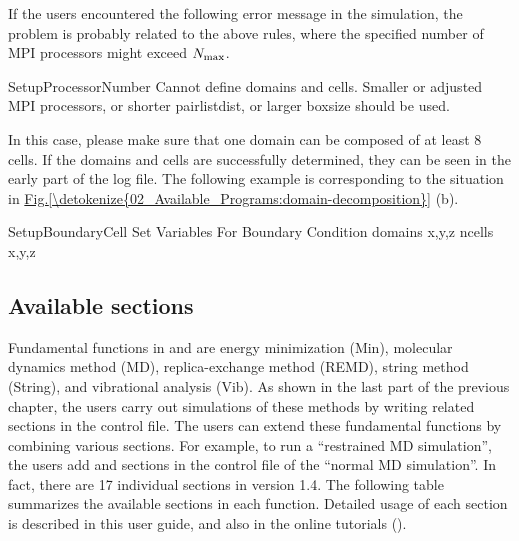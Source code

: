 \documentclass[a4paper,11pt,oneside,english]{sphinxmanual}
\begin{document}
If the users encountered the following error message in the simulation,
the problem is probably related to the above rules, where the specified number
of MPI processors might exceed \(N_{\rm max}\).

\begin{sphinxVerbatim}[commandchars=\\\{\}]
Setup\PYGZus{}Processor\PYGZus{}Number\PYGZgt{} Cannot define domains and cells. Smaller or
adjusted MPI processors, or shorter pairlistdist, or larger boxsize
should be used.
\end{sphinxVerbatim}

In this case, please make sure that one domain can be composed of at least 8 cells.
If the domains and cells are successfully determined,
they can be seen in the early part of the log file.
The following example is corresponding to the situation in \hyperref[\detokenize{02_Available_Programs:domain-decomposition}]{Fig.\@ \ref{\detokenize{02_Available_Programs:domain-decomposition}}} (b).

\begin{sphinxVerbatim}[commandchars=\\\{\}]
Setup\PYGZus{}Boundary\PYGZus{}Cell\PYGZgt{} Set Variables For Boundary Condition
  domains x,y,z                             
  ncells x,y,z                              
\end{sphinxVerbatim}


\subsection{Available sections}
\label{\detokenize{02_Available_Programs:available-sections}}
Fundamental functions in  and  are energy minimization (Min),
molecular dynamics method (MD), replica-exchange method (REMD),
string method (String), and vibrational analysis (Vib).
As shown in the last part of the previous chapter, the users carry out simulations
of these methods by writing related sections in the control file.
The users can extend these fundamental functions by combining various sections.
For example, to run a “restrained MD simulation”, the users
add \sphinxstylestrong{{[}SELECTION{]}} and \sphinxstylestrong{{[}RESTRAINTS{]}} sections in the control file of the “normal MD simulation”.
In fact, there are 17 individual sections in  version 1.4.
The following table summarizes the available sections in each function.
Detailed usage of each section is described in this user guide,
and also in the online tutorials ().
\end{document}
